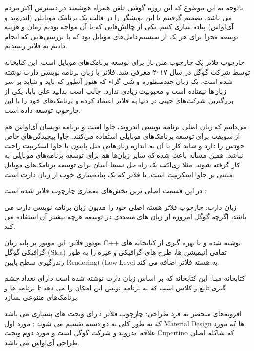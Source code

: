 
باتوجه به این موضوع که این روزه گوشی تلفن همراه هوشمند در دسترس اکثر مردم می‌ باشد، تصمیم گرفتیم تا این پویشگر را در قالب یک برنامک موبایلی (اندروید و آی‌او‌اس) پیاده سازی کنیم. 
یکی از چالش‌هایی که  با آن مواجه بودیم زمان و هزینه توسعه مجزا برای هر یک از سیستم‌عامل‌های موبایل بود که با بررسی‌هایی که انجام دادیم به فلاتر رسیدیم.

چارچوب فلاتر یک چارچوب متن باز برای توسعه برنامک‌های موبایل است. این کتابخانه توسط شرکت گوگل در سال ۲۰۱۷ معرفی شد. فلاتر با زبان برنامه نویسی دارت نوشته شده است، یک زبان چندمنظوره و شی گراء که هنوز آنطور که باید و شاید بر سر زبان‌ها نیفتاده است و محبوبیت زیادی ندارد. جالب است بدانید علی بابا، یکی از بزرگترین شرکت‌های چینی در دنیا به فلاتر اعتماد کرده و برنامک‌های خود را با این چارچوب توسعه داده است. 

می‌دانیم که زبان اصلی برنامه نویسی اندروید، جاوا است و برنامه نویسان آی‌او‌اس هم از سویفت برای توسعه برنامک‌های موبایلی استفاده می‌کنند. جاوا پیچیدگی‌های خاص خودش را دارد و شاید کار با آن به اندازه زبان‌هایی مثل پایتون یا جاوا اسکریپت راحت نباشد. همین مساله باعث شده که سایر زبان‌ها هم برای توسعه برنامه‌های موبایلی به کار گرفته شوند. مثلا ری‌اکت یک راه حل نسبتا آسان برای توسعه برنامک‌های موبایل مبتنی بر جاوا اسکریپت است. یا فلاتر که یک پیاده‌سازی خوب از زبان دارت است.


در این قسمت اصلی ترین بخش‌های معماری چارچوب فلاتر  شده است :

 زبان دارت: 
چارچوب فلاتر هسته اصلی خود را مدیون زبان برنامه نویسی دارت می باشد، اگرچه گوگل امروزه از زبان های متعددی در توسعه هرچه بیشتر آن استفاده می کند.

 موتور فلاتر:
این موتور بر پایه زبان C++ نوشته شده و با بهره گیری از کتابخانه های گرافیکی گوگل (Skia) تمامی انیمیشن ها، طرح های گرافیکی و غیره را به طور رندرگیری سطح پایین Rendering) (Low-Level به هسته فلاتر اضافه می کند.

 کتابخانه مبنا:
این کتابخانه که بر اساس زبان دارت نوشته شده است دارای تعداد چشم گیری تابع و کلاس است که به برنامه نویس این امکان را می دهد تا برنامه ها و برنامک‌های متنوعی بسازد.

 افزونه‌های منحصر به فرد طراحی:
چارچوب فلاتر دارای ویجت های بسیاری می باشد که به طور کلی به دو دسته تقسیم می شوند : مورد اول Material Design ها که مورد علاقه اندروید و شرکت گوگل است و مورد دوم ویجت Cupertino که شاکله اصلی طراحی آی‌او‌اس می باشد.




